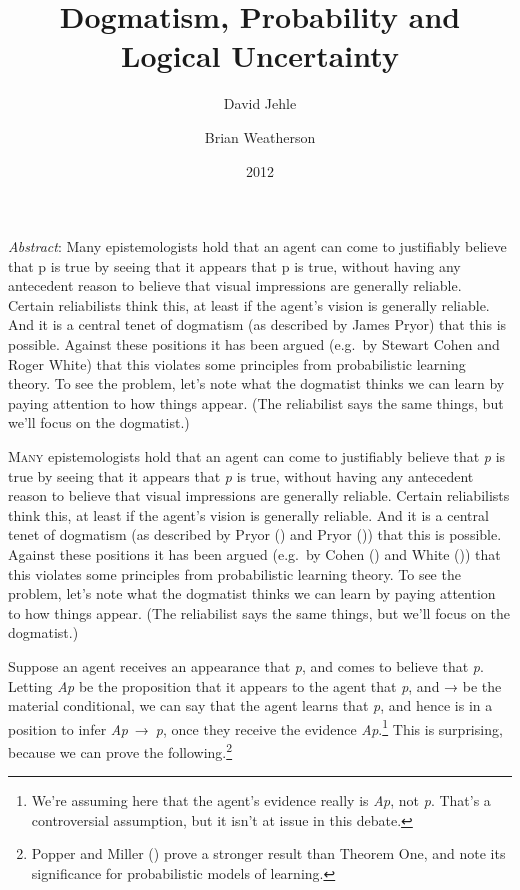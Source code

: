\documentclass[
  11pt,
  letterpaper,
  DIV=11,
  numbers=noendperiod,
  twoside]{scrartcl}
\title{Dogmatism, Probability and Logical Uncertainty}
\author{David Jehle \and Brian Weatherson}
\date{2012}
\renewenvironment{abstract}
 {\vspace{-1.25cm}
 \quotation\small\noindent\emph{Abstract}:}
 {\endquotation}
\renewenvironment{abstract}
 {\quotation\small\noindent\emph{Abstract}:}
 {\endquotation\vspace{-0.02cm}}
\begin{document}
\maketitle
\begin{abstract}
Many epistemologists hold that an agent can come to justifiably believe
that p is true by seeing that it appears that p is true, without having
any antecedent reason to believe that visual impressions are generally
reliable. Certain reliabilists think this, at least if the agent's
vision is generally reliable. And it is a central tenet of dogmatism (as
described by James Pryor) that this is possible. Against these positions
it has been argued (e.g.~by Stewart Cohen and Roger White) that this
violates some principles from probabilistic learning theory. To see the
problem, let's note what the dogmatist thinks we can learn by paying
attention to how things appear. (The reliabilist says the same things,
but we'll focus on the dogmatist.)
\end{abstract}


\lettrine{M}{any} epistemologists hold that an agent can come to
justifiably believe that \emph{p} is true by seeing that it appears that
\emph{p} is true, without having any antecedent reason to believe that
visual impressions are generally reliable. Certain reliabilists think
this, at least if the agent's vision is generally reliable. And it is a
central tenet of dogmatism (as described by Pryor
() and Pryor
()) that this is possible. Against these
positions it has been argued (e.g.~by Cohen
() and White
()) that this violates some principles
from probabilistic learning theory. To see the problem, let's note what
the dogmatist thinks we can learn by paying attention to how things
appear. (The reliabilist says the same things, but we'll focus on the
dogmatist.)

Suppose an agent receives an appearance that \emph{p}, and comes to
believe that \emph{p}. Letting \emph{Ap} be the proposition that it
appears to the agent that \emph{p}, and → be the material conditional,
we can say that the agent learns that \emph{p}, and hence is in a
position to infer \emph{Ap}~→~\emph{p}, once they receive the evidence
\emph{Ap}.\footnote{We're assuming here that the agent's evidence really
  is \emph{Ap}, not \emph{p}. That's a controversial assumption, but it
  isn't at issue in this debate.} This is surprising, because we can
prove the following.\footnote{Popper and Miller
  () prove a stronger result than
  Theorem One, and note its significance for probabilistic models of
  learning.}
\end{document}
